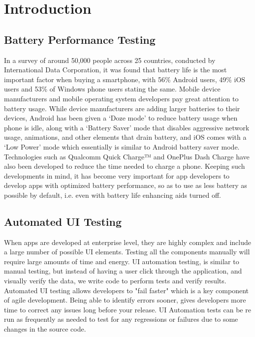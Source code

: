 \chapter{Introduction}


\section{Battery Performance Testing}
In a survey of around 50,000 people across 25 countries, conducted by International Data Corporation, it was found that battery life is the most important factor when buying a smartphone, with 56\% Android users, 49\% iOS users and 53\% of Windows phone users stating the same.\cite{idcsurvey} Mobile device manufacturers and mobile operating system developers pay great attention to battery usage. While device manufacturers are adding larger batteries to their devices, Android has been given a ‘Doze mode’ to reduce battery usage when phone is idle, along with a ‘Battery Saver’ mode that disables aggressive network usage, animations, and other elements that drain battery, and iOS comes with a ‘Low Power’ mode which essentially is similar to Android battery saver mode. Technologies such as Qualcomm Quick Charge™ and OnePlus Dash Charge have also been developed to reduce the time needed to charge a phone. Keeping such developments in mind, it has become very important for app developers to develop apps with optimized battery performance, so as to use as less battery as possible by default, i.e. even with battery life enhancing aids turned off.

\section{Automated UI Testing}
When apps are developed at enterprise level, they are highly complex and include a large number of possible UI elements. Testing all the components manually will require large amounts of time and energy. UI automation testing, is similar to manual testing, but instead of having a user click through the application, and visually verify the data, we write code to perform tests and verify results. Automated UI testing allows developers to "fail faster" which is a key component of agile development. Being able to identify errors sooner, gives developers more time to correct any issues long before your release. UI Automation tests can be re run as frequently as needed to test for any regressions or failures due to some changes in the source code.

